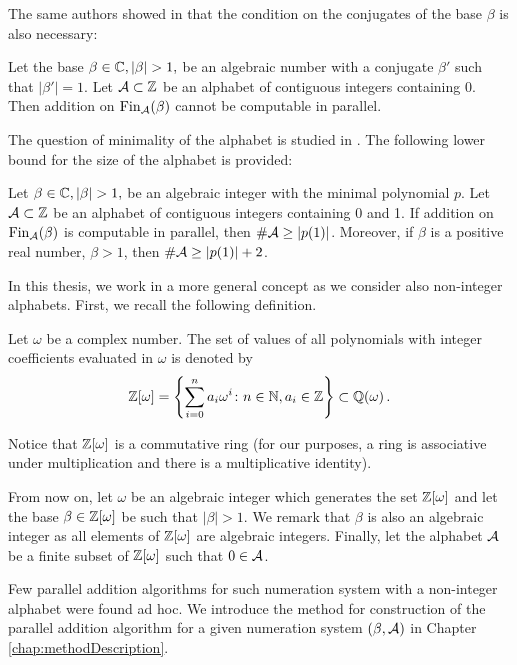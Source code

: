 \begin{upravit}
The same authors showed in \cite{kBlock} that the condition on the conjugates of the base $\beta$ is also necessary:
  \begin{thm}
  Let the base $\beta\in\CC, |\beta|>1,$ be an algebraic number with a conjugate $\beta'$ such that $|\beta'|=1$. Let $\mathcal{A}\subset\mathbb{Z}$ be an alphabet of contiguous integers containing 0. Then addition on $\text{Fin}_{\mathcal{A}}(\beta)$ cannot be computable in parallel.
  \end{thm}
  
The question of minimality of the alphabet is studied in \cite{minAlph}. The following lower bound for the size of the alphabet is provided:
  \begin{thm}
  \label{thm:lowerBoundAlphabet}
  Let $\beta\in\CC, |\beta|>1,$  be an algebraic integer with the minimal polynomial $p$. Let $\mathcal{A}\subset\mathbb{Z}$ be an alphabet of contiguous integers containing 0 and 1. If addition on $\text{Fin}_{\mathcal{A}}(\beta)$ is computable in parallel, then $\#\mathcal{A} \geq |p(1)|$. Moreover, if $\beta$ is a positive real number, $\beta>1$, then $\#\mathcal{A} \geq  |p(1)|+2$.
  \end{thm}
  

In this thesis, we work in a more general concept as we consider also non-integer alphabets. First, we recall the following definition.
\begin{defn}
Let $\omega$ be a complex number. The set of values of all polynomials with integer coefficients evaluated in $\omega$ is denoted by
$$
    \mathbb{Z}[\omega] =\left\{\sum_{i=0}^n a_i \omega^i\colon n\in\mathbb{N}, a_i\in\mathbb{Z} \right\} \subset \mathbb{Q}(\omega)\,.
$$
\end{defn}
 Notice that $\mathbb{Z}[\omega]$ is a commutative ring (for our purposes, a ring is associative under multiplication and there is a multiplicative identity).     
    
From now on, let $\omega$ be an algebraic integer  which generates the set $\mathbb{Z}[\omega]$ and let the base $\beta\in\mathbb{Z}[\omega]$ be such that $|\beta|>1$. We remark that $\beta$ is also an algebraic integer as all elements of $\mathbb{Z}[\omega]$ are algebraic integers. Finally, let the alphabet $\mathcal{A}$ be a finite subset of $\mathbb{Z}[\omega]$ such that $0\in\mathcal{A}$.

Few parallel addition algorithms for such numeration system with a non-integer alphabet were found ad hoc. We introduce the method for construction of the parallel addition algorithm for a given numeration system $(\beta,\mathcal{A})$ in Chapter \ref{chap:methodDescription}. 
  



\end{upravit}
